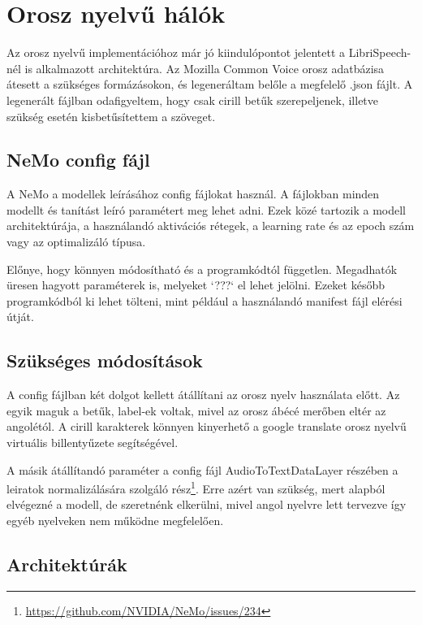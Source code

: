 \section{Orosz nyelvű hálók}

Az orosz nyelvű implementációhoz már jó kiindulópontot jelentett a LibriSpeech-nél is alkalmazott architektúra. Az Mozilla Common Voice orosz adatbázisa átesett a szükséges formázásokon, és legeneráltam belőle a megfelelő .json fájlt. A legenerált fájlban odafigyeltem, hogy csak cirill betűk szerepeljenek, illetve szükség esetén kisbetűsítettem a szöveget.

\subsection{NeMo config fájl}

A NeMo a modellek leírásához config fájlokat használ. A fájlokban minden modellt és tanítást leíró paramétert meg lehet adni. Ezek közé tartozik a modell architektúrája, a használandó aktivációs rétegek, a learning rate és az epoch szám vagy az optimalizáló típusa.

Előnye, hogy könnyen módosítható és a programkódtól független. Megadhatók üresen hagyott paraméterek is, melyeket `???` el lehet jelölni. Ezeket később programkódból ki lehet tölteni, mint például a használandó manifest fájl elérési útját.


\subsection{Szükséges módosítások}

A config fájlban két dolgot kellett átállítani az orosz nyelv használata előtt. Az egyik maguk a betűk, label-ek voltak, mivel az orosz ábécé merőben eltér az angolétól. A cirill karakterek könnyen kinyerhető a google translate orosz nyelvű virtuális billentyűzete segítségével.

A másik átállítandó paraméter a config fájl AudioToTextDataLayer részében a leiratok normalizálására szolgáló rész\footnote{\url{https://github.com/NVIDIA/NeMo/issues/234}}. Erre azért van szükség, mert alapból elvégezné a modell, de szeretnénk elkerülni, mivel angol nyelvre lett tervezve így egyéb nyelveken nem működne megfelelően.

\subsection{Architektúrák}

